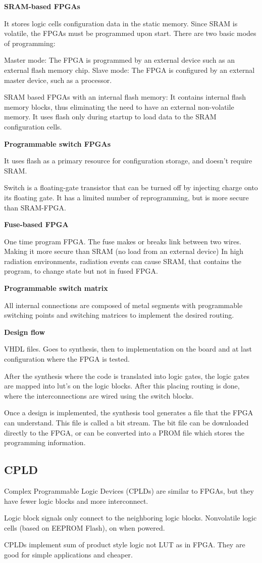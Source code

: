 \textbf{SRAM-based FPGAs}

It stores logic cells configuration data in the static memory.
Since SRAM is volatile, the FPGAs must be programmed upon start.
There are two basic modes of programming:

Master mode: The FPGA is programmed by an external device such as an
external flash memory chip.
Slave mode: The FPGA is configured by an external master device,
such as a processor.

SRAM based FPGAs with an internal flash memory:
It contains internal flash memory blocks, thus eliminating the need to have
an external non-volatile memory. It uses flash only during startup to load
data to the SRAM configuration cells.


\textbf{Programmable switch FPGAs}

It uses flash as a primary resource for configuration storage,
and doesn't require SRAM.

Switch is a floating-gate transistor that can be turned off by
injecting charge onto its floating gate.
It has a limited number of reprogramming, but is more secure
than SRAM-FPGA.


\textbf{Fuse-based FPGA}

One time program FPGA.
The fuse makes or breaks link between two wires.
Making it more secure than SRAM (no load from an external device)
In high radiation environments, radiation events can cause SRAM,
that contains the program, to change state but not in fused FPGA.

\textbf{Programmable switch matrix}

All internal connections are composed of metal segments with
programmable switching points and switching matrices to
implement the desired routing.



\textbf{Design flow}

VHDL files. Goes to synthesis, then to implementation on the board
and at last configuration where the FPGA is tested.

After the synthesis where the code is translated into logic gates,
the logic gates are mapped into lut's on the logic blocks. After
this placing routing is done, where the interconnections are
wired using the switch blocks.


Once a design is implemented, the synthesis tool generates a file that
the FPGA can understand. This file is called a bit stream.
The bit file can be downloaded directly to the FPGA, or can be converted
into a PROM file which stores the programming information.


\subsection{CPLD}

Complex Programmable Logic Devices (CPLDs) are similar to FPGAs,
but they have fewer logic blocks and more interconnect.

Logic block signals only connect to the neighboring logic blocks.
Nonvolatile logic cells (based on EEPROM Flash), on when powered.

CPLDs implement sum of product style logic not LUT as in FPGA.
They are good for simple applications and cheaper.
